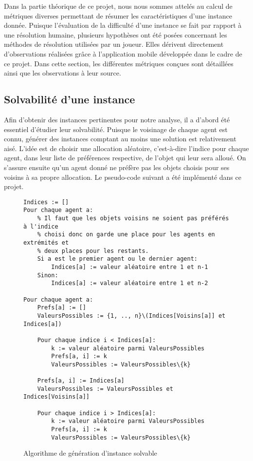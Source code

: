 \documentclass[../main.tex]{subfiles}
\begin{document}
	Dans la partie théorique de ce projet, nous nous sommes attelés au calcul de métriques diverses permettant de résumer les caractéristiques d'une instance donnée. Puisque l'évaluation de la difficulté d'une instance se fait par rapport à une résolution humaine, plusieurs hypothèses ont été posées concernant les méthodes de résolution utilisées par un joueur. Elles dérivent directement d'observations réalisées grâce à l'application mobile développée dans le cadre de ce projet. Dans cette section, les différentes métriques conçues sont détaillées ainsi que les observations à leur source.
	
	\subsection{Solvabilité d'une instance}
	Afin d'obtenir des instances pertinentes pour notre analyse, il a d'abord été essentiel d'étudier leur solvabilité. Puisque le voisinage de chaque agent est connu, générer des instances comptant au moins une solution est relativement aisé. L'idée est de choisir une allocation aléatoire, c'est-à-dire l'indice pour chaque agent, dans leur liste de préférences respective, de l'objet qui leur sera alloué. On s'assure ensuite qu'un agent donné ne préfère pas les objets choisis pour ses voisins à sa propre allocation. Le pseudo-code suivant a été implémenté dans ce projet. 

\begin{figure}[ht!]
\begin{lstlisting}
Indices := []
Pour chaque agent a:
    % Il faut que les objets voisins ne soient pas préférés à l'indice
    % choisi donc on garde une place pour les agents en extrémités et 
    % deux places pour les restants.
    Si a est le premier agent ou le dernier agent:
        Indices[a] := valeur aléatoire entre 1 et n-1
    Sinon:
        Indices[a] := valeur aléatoire entre 1 et n-2

Pour chaque agent a:
    Prefs[a] := []
    ValeursPossibles := {1, .., n}\(Indices[Voisins[a]] et Indices[a])

    Pour chaque indice i < Indices[a]:
        k := valeur aléatoire parmi ValeursPossibles
        Prefs[a, i] := k
        ValeursPossibles := ValeursPossibles\{k}
        
    Prefs[a, i] := Indices[a]
    ValeursPossibles := ValeursPossibles et Indices[Voisins[a]]
    
    Pour chaque indice i > Indices[a]:
        k := valeur aléatoire parmi ValeursPossibles
        Prefs[a, i] := k
        ValeursPossibles := ValeursPossibles\{k}
\end{lstlisting}
\caption{Algorithme de génération d'instance solvable}
\label{fig-solvalg}
\end{figure}
\end{document}
